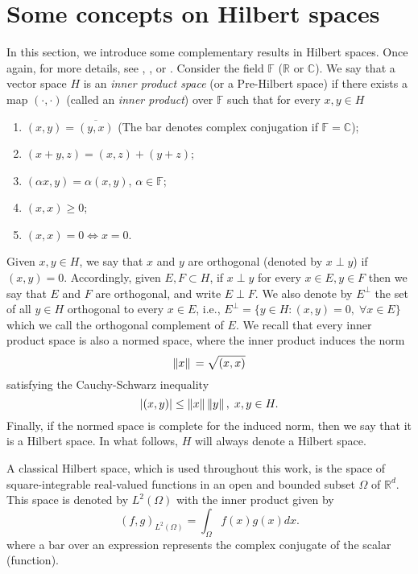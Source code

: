 \section{Some concepts on Hilbert spaces}
In this section, we introduce some complementary results in Hilbert spaces. Once again, for more details, see \cite{rudin1991functional}, \cite{brezis2011functional}, or \cite{arendt2010partielle}. Consider the field \(\mathbb{F}\) (\(\mathbb{R}\) or \(\mathbb{C}\)). We say that a vector space \(H\) is an \textit{inner product space} (or a Pre-Hilbert space) if there exists a map \((\cdot,\cdot)\) (called an \textit{inner product}) over \(\mathbb{F}\) such that for every \(x, y \in H\)
\begin{enumerate}
    \item \((x, y) = \overline{(y, x)}\) (The bar denotes complex conjugation if \(\mathbb{F} = \mathbb{C}\));
    \item \((x+y,z) = (x,z)+(y+z)\);
    \item \((\alpha x, y)=\alpha(x, y)\), \(\alpha \in \mathbb{F}\);
    \item \((x, x) \geq 0\);
    \item \((x, x) = 0 \iff x=0\).
\end{enumerate}
Given \(x, y \in H\), we say that \(x\) and \(y\) are orthogonal (denoted by \(x \perp y\)) if \((x, y) = 0\). Accordingly, given \(E, F \subset H\), if \(x\perp y\) for every \(x \in E, y \in F\) then we say that \(E\) and \(F\) are orthogonal, and write \(E \perp F\). We also denote by \(E^\perp\) the set of all \(y \in H\) orthogonal to every \(x \in E\), i.e., \(E^\perp = \{y \in H: (x, y)=0, \; \forall x \in E\}\) which we call the orthogonal complement of \(E\). We recall that every inner product space is also a normed space, where the inner product induces the norm
\[
\norm*{x} = \sqrt{(x, x)}   
\]
satisfying the Cauchy-Schwarz inequality
\[
\abs{(x, y)} \leq \norm*{x}\norm*{y}, \; x, y \in H.
\]
Finally, if the normed space is complete for the induced norm, then we say that it is a Hilbert space. In what follows, \(H\) will always denote a Hilbert space.

\begin{example}
    A classical Hilbert space, which is used throughout this work, is the space of square-integrable real-valued functions in an open and bounded subset \(\Omega\) of \(\mathbb{R}^d\). This space is denoted by \(L^2(\Omega)\) with the inner product given by
    \[
    (f, g)_{L^2(\Omega)} = \int_\Omega f(x)g(x) dx.
    \]
    where a bar over an expression represents the complex conjugate of the scalar (function).
\end{example}

